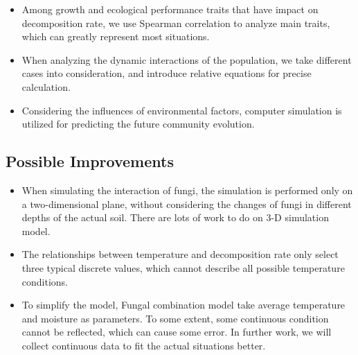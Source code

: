 \documentclass{mcmthesis}
\begin{document}
\begin{itemize}
  \item Among growth and ecological performance traits that have impact on decomposition rate, we use Spearman correlation to analyze main traits, which can greatly represent most situations.
  \item When analyzing the dynamic interactions of the population, we take different cases into consideration, and introduce relative equations for precise calculation.
  \item Considering the influences of environmental factors, computer simulation is utilized for predicting the future community evolution.
\end{itemize}

\subsection{Possible Improvements}

\begin{itemize}
  \item When simulating the interaction of fungi, the simulation is performed only on a two-dimensional plane, without considering the changes of fungi in different depths of the actual soil. There are lots of work to do on 3-D simulation model.
  \item The relationships between temperature and decomposition rate only select three typical discrete values, which cannot describe all possible temperature conditions.
  \item To simplify the model, Fungal combination model take average temperature and moisture as parameters. To some extent, some continuous condition cannot be reflected, which can cause some error. In further work, we will collect continuous data to fit the actual situations better.
\end{itemize}

{}


\newpage
\end{document}
